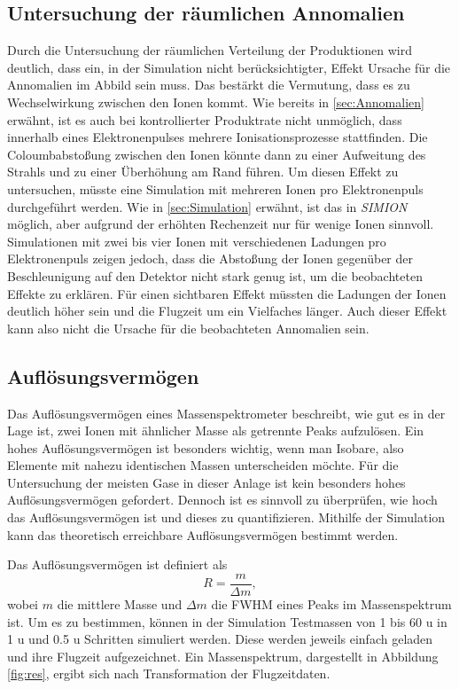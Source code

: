 \subsection{Untersuchung der räumlichen Annomalien}
Durch die Untersuchung der räumlichen Verteilung der Produktionen wird deutlich, dass ein, in der Simulation nicht berücksichtigter, Effekt Ursache für die Annomalien im Abbild sein muss. Das bestärkt die Vermutung, dass es zu Wechselwirkung zwischen den Ionen kommt. Wie bereits in \ref{sec:Annomalien} erwähnt, ist es auch bei kontrollierter Produktrate nicht unmöglich, dass innerhalb eines Elektronenpulses mehrere Ionisationsprozesse stattfinden. Die Coloumbabstoßung zwischen den Ionen könnte dann zu einer Aufweitung des Strahls und zu einer Überhöhung am Rand führen. Um diesen Effekt zu untersuchen, müsste eine Simulation mit mehreren Ionen pro Elektronenpuls durchgeführt werden. Wie in \ref{sec:Simulation} erwähnt, ist das in \textit{SIMION} möglich, aber aufgrund der erhöhten Rechenzeit nur für wenige Ionen sinnvoll. Simulationen mit zwei bis vier Ionen mit verschiedenen Ladungen pro Elektronenpuls zeigen jedoch, dass die Abstoßung der Ionen gegenüber der Beschleunigung auf den Detektor nicht stark genug ist, um die beobachteten Effekte zu erklären. Für einen sichtbaren Effekt müssten die Ladungen der Ionen deutlich höher sein und die Flugzeit um ein Vielfaches länger. Auch dieser Effekt kann also nicht die Ursache für die beobachteten Annomalien sein.

\label{sec:delay}
\subsection{Auflösungsvermögen}
Das Auflösungsvermögen eines Massenspektrometer beschreibt, wie gut es in der Lage ist, zwei Ionen mit ähnlicher Masse als getrennte Peaks aufzulösen. Ein hohes Auflösungsvermögen ist besonders wichtig, wenn man Isobare, also Elemente mit nahezu identischen Massen unterscheiden möchte. Für die Untersuchung der meisten Gase in dieser Anlage ist kein besonders hohes Auflösungsvermögen gefordert. Dennoch ist es sinnvoll zu überprüfen, wie hoch das Auflösungsvermögen ist und dieses zu quantifizieren. Mithilfe der Simulation kann das theoretisch erreichbare Auflösungsvermögen bestimmt werden. 

Das Auflösungsvermögen ist definiert als 
\begin{equation}
    R = \frac{m}{\Delta m},
    \label{eq:res}
\end{equation}
wobei $m$ die mittlere Masse und $\Delta m$ die FWHM eines Peaks im Massenspektrum ist. Um es zu bestimmen, können in der Simulation Testmassen von 1 bis 60 u in 1 u und 0.5 u Schritten simuliert werden. Diese werden jeweils einfach geladen und ihre Flugzeit aufgezeichnet. Ein Massenspektrum, dargestellt in Abbildung \ref{fig:res}, ergibt sich nach Transformation der Flugzeitdaten.

